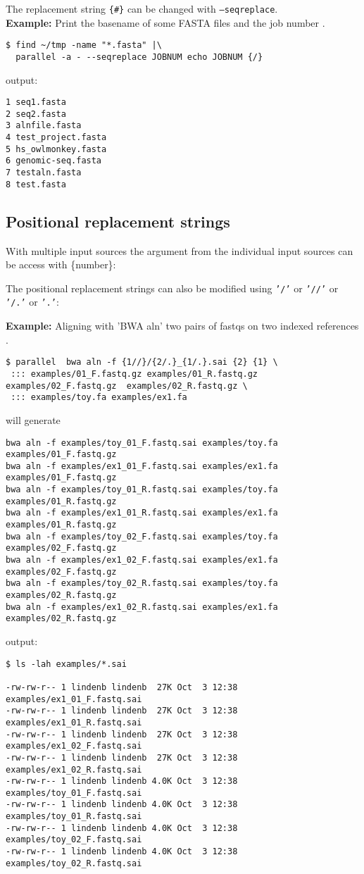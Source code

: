 \documentclass{article}
\newcommand{\example}[1]{
\textbf{Example: } {\color[rgb]{0,0,1} #1 } .
}
\begin{document}
The replacement string \texttt{\{\#\}} can be changed with  \texttt{--seqreplace}.\\
\example{Print the basename of some FASTA files and the job number}
\begin{lstlisting}
$ find ~/tmp -name "*.fasta" |\
  parallel -a - --seqreplace JOBNUM echo JOBNUM {/}
\end{lstlisting}
output:
\begin{lstlisting}
1 seq1.fasta
2 seq2.fasta
3 alnfile.fasta
4 test_project.fasta
5 hs_owlmonkey.fasta
6 genomic-seq.fasta
7 testaln.fasta
8 test.fasta
\end{lstlisting}


\subsection{Positional replacement strings}
With multiple input sources the argument from the individual input sources can be access with \{number\}:


The positional replacement strings can also be modified using  \texttt{'/'}  or \texttt{'//'} or \texttt{'/.'} or  \texttt{'.'}:

\example{Aligning with 'BWA aln' two pairs of fastqs on two indexed references}
\begin{lstlisting}
$ parallel  bwa aln -f {1//}/{2/.}_{1/.}.sai {2} {1} \
 ::: examples/01_F.fastq.gz examples/01_R.fastq.gz examples/02_F.fastq.gz  examples/02_R.fastq.gz \
 ::: examples/toy.fa examples/ex1.fa
\end{lstlisting}
will generate
\begin{lstlisting}
bwa aln -f examples/toy_01_F.fastq.sai examples/toy.fa examples/01_F.fastq.gz
bwa aln -f examples/ex1_01_F.fastq.sai examples/ex1.fa examples/01_F.fastq.gz
bwa aln -f examples/toy_01_R.fastq.sai examples/toy.fa examples/01_R.fastq.gz
bwa aln -f examples/ex1_01_R.fastq.sai examples/ex1.fa examples/01_R.fastq.gz
bwa aln -f examples/toy_02_F.fastq.sai examples/toy.fa examples/02_F.fastq.gz
bwa aln -f examples/ex1_02_F.fastq.sai examples/ex1.fa examples/02_F.fastq.gz
bwa aln -f examples/toy_02_R.fastq.sai examples/toy.fa examples/02_R.fastq.gz
bwa aln -f examples/ex1_02_R.fastq.sai examples/ex1.fa examples/02_R.fastq.gz
\end{lstlisting}

output:
\begin{lstlisting}
$ ls -lah examples/*.sai

-rw-rw-r-- 1 lindenb lindenb  27K Oct  3 12:38 examples/ex1_01_F.fastq.sai
-rw-rw-r-- 1 lindenb lindenb  27K Oct  3 12:38 examples/ex1_01_R.fastq.sai
-rw-rw-r-- 1 lindenb lindenb  27K Oct  3 12:38 examples/ex1_02_F.fastq.sai
-rw-rw-r-- 1 lindenb lindenb  27K Oct  3 12:38 examples/ex1_02_R.fastq.sai
-rw-rw-r-- 1 lindenb lindenb 4.0K Oct  3 12:38 examples/toy_01_F.fastq.sai
-rw-rw-r-- 1 lindenb lindenb 4.0K Oct  3 12:38 examples/toy_01_R.fastq.sai
-rw-rw-r-- 1 lindenb lindenb 4.0K Oct  3 12:38 examples/toy_02_F.fastq.sai
-rw-rw-r-- 1 lindenb lindenb 4.0K Oct  3 12:38 examples/toy_02_R.fastq.sai
\end{lstlisting}
\end{document}
